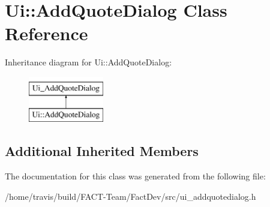 \hypertarget{classUi_1_1AddQuoteDialog}{\section{Ui\-:\-:Add\-Quote\-Dialog Class Reference}
\label{classUi_1_1AddQuoteDialog}
}
Inheritance diagram for Ui\-:\-:Add\-Quote\-Dialog\-:\begin{figure}[H]
\begin{center}
\leavevmode
\includegraphics[height=2.000000cm]{d0/d21/classUi_1_1AddQuoteDialog}
\end{center}
\end{figure}
\subsection*{Additional Inherited Members}


The documentation for this class was generated from the following file\-:\begin{DoxyCompactItemize}
\item 
/home/travis/build/\-F\-A\-C\-T-\/\-Team/\-Fact\-Dev/src/ui\-\_\-addquotedialog.\-h\end{DoxyCompactItemize}
